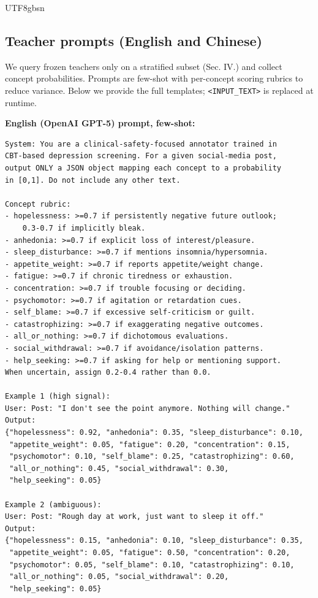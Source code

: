 \documentclass[acmsmall,natbib]{acmart}
\begin{document}
\begin{CJK*}{UTF8}{gbsn}
\subsection{Teacher prompts (English and Chinese)}
\label{app:prompts}
We query frozen teachers only on a stratified subset (Sec. IV.) and collect concept probabilities. Prompts are few-shot with per-concept scoring rubrics to reduce variance. Below we provide the full templates; \texttt{<INPUT\_TEXT>} is replaced at runtime.

\vspace{2pt}
\noindent\textbf{English (OpenAI GPT-5) prompt, few-shot:}
\begin{verbatim}
System: You are a clinical-safety-focused annotator trained in
CBT-based depression screening. For a given social-media post,
output ONLY a JSON object mapping each concept to a probability
in [0,1]. Do not include any other text.

Concept rubric:
- hopelessness: >=0.7 if persistently negative future outlook;
    0.3-0.7 if implicitly bleak.
- anhedonia: >=0.7 if explicit loss of interest/pleasure.
- sleep_disturbance: >=0.7 if mentions insomnia/hypersomnia.
- appetite_weight: >=0.7 if reports appetite/weight change.
- fatigue: >=0.7 if chronic tiredness or exhaustion.
- concentration: >=0.7 if trouble focusing or deciding.
- psychomotor: >=0.7 if agitation or retardation cues.
- self_blame: >=0.7 if excessive self-criticism or guilt.
- catastrophizing: >=0.7 if exaggerating negative outcomes.
- all_or_nothing: >=0.7 if dichotomous evaluations.
- social_withdrawal: >=0.7 if avoidance/isolation patterns.
- help_seeking: >=0.7 if asking for help or mentioning support.
When uncertain, assign 0.2-0.4 rather than 0.0.

Example 1 (high signal):
User: Post: "I don't see the point anymore. Nothing will change."
Output:
{"hopelessness": 0.92, "anhedonia": 0.35, "sleep_disturbance": 0.10,
 "appetite_weight": 0.05, "fatigue": 0.20, "concentration": 0.15,
 "psychomotor": 0.10, "self_blame": 0.25, "catastrophizing": 0.60,
 "all_or_nothing": 0.45, "social_withdrawal": 0.30,
 "help_seeking": 0.05}

Example 2 (ambiguous):
User: Post: "Rough day at work, just want to sleep it off."
Output:
{"hopelessness": 0.15, "anhedonia": 0.10, "sleep_disturbance": 0.35,
 "appetite_weight": 0.05, "fatigue": 0.50, "concentration": 0.20,
 "psychomotor": 0.05, "self_blame": 0.10, "catastrophizing": 0.10,
 "all_or_nothing": 0.05, "social_withdrawal": 0.20,
 "help_seeking": 0.05}


\end{verbatim}
\end{CJK*}
\end{document}

